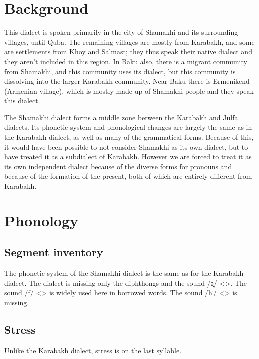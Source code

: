 \section{Background}
This dialect is spoken primarily in the city of Shamakhi and its surrounding villages, until Quba. The remaining villages are mostly  from Karabakh,  and some are settlements from Khoy and Salmast; they thus speak their native dialect and they aren't included in this region. In Baku also, there is a migrant community from Shamakhi, and this community uses its dialect, but this community is dissolving into the larger Karabakh community. Near Baku there is Ermenikend (Armenian village), which is mostly made up of Shamakhi people and they speak this dialect. 

The Shamakhi dialect forms a middle zone between the Karabakh and Julfa dialects. Its phonetic system and phonological changes are largely the same as in the Karabakh dialect, as well as many of the grammatical forms. Because of this, it would have been possible to not consider Shamakhi as its own dialect, but to have treated it as a subdialect of Karabakh. However we are forced to treat it as its own independent dialect because of the diverse forms for pronouns and because of the formation of the present, both of which are entirely different from Karabakh. 

\section{Phonology}

\subsection{Segment inventory}
The phonetic system of the Shamakhi dialect is the same as for the Karabakh dialect. The dialect is missing only the diphthongs and the sound /ə̟/ <>. The sound /f/ <> is widely used here in borrowed words. The sound /hʲ/ <> is missing. 

\subsection{Stress}
Unlike the Karabakh dialect, stress is on the last syllable. 

